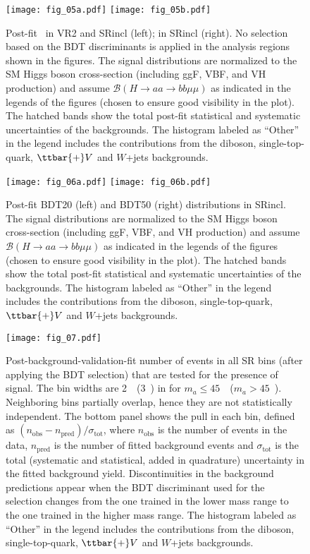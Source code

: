\documentclass[cernpreprint, backref=false, texlive=2020, UKenglish, dvipsnames, block=none, texmf]{atlasdoc}
\begin{document}
\begin{figure}
\centering
\texttt{[image: fig\_05a.pdf]}
\texttt{[image: fig\_05b.pdf]}
\caption{Post-fit \LogL~in VR2 and SRincl (left); \Mmm in SRincl (right). No selection based on the BDT discriminants is applied in the analysis regions shown in the figures. The signal distributions are normalized to the SM Higgs boson cross-section (including ggF, VBF, and VH production) and assume
$\mathcal{B}(H \rightarrow aa \rightarrow bb\mu\mu)$ as indicated in the legends of the figures (chosen to ensure good visibility in the plot). The hatched bands show the total post-fit statistical and systematic uncertainties of the backgrounds. The histogram labeled as ``Other'' in the legend includes the contributions from the diboson, single-top-quark, $\ttbar{+}V$ and $W$+jets backgrounds. }
\label{SRvalidation2}
\end{figure}
 
 
\begin{figure}
\centering
\texttt{[image: fig\_06a.pdf]}
\texttt{[image: fig\_06b.pdf]}
\caption{Post-fit BDT20 (left) and BDT50 (right) distributions in SRincl. The signal distributions are normalized to the SM Higgs boson cross-section (including ggF, VBF, and VH production) and assume
$\mathcal{B}(H \rightarrow aa \rightarrow bb\mu\mu)$ as indicated in the legends of the figures (chosen to ensure good visibility in the plot). The hatched bands show the total post-fit statistical and systematic uncertainties of the backgrounds. The histogram labeled as ``Other'' in the legend includes the contributions from the diboson, single-top-quark, $\ttbar{+}V$ and $W$+jets backgrounds. }
\label{SRvalidation3}
\end{figure}
 
 
 
\begin{figure}
\centering
\texttt{[image: fig\_07.pdf]}
\caption{Post-background-validation-fit number of  events in all SR bins (after applying the BDT selection) that are tested for the presence of signal. The bin widths are 2~\GeV\ (3~\GeV) in \Mmm for $m_a\leq45$~\GeV\ ($m_a>45$~\GeV). Neighboring bins partially overlap, hence they are not statistically independent.
The bottom panel shows the pull in each bin, defined as $(n_\mathrm{obs}-n_\mathrm{pred})/\sigma_\mathrm{tot}$, where $n_\mathrm{obs}$ is the number of events in the data, $n_\mathrm{pred}$ is the number of fitted background events and $\sigma_\mathrm{tot}$ is the total (systematic and statistical, added in quadrature) uncertainty in the fitted background yield.
Discontinuities in the background predictions appear when the BDT discriminant used for the selection changes from the one trained in the lower mass range to the one trained in the higher mass range. The histogram labeled as ``Other'' in the legend includes the contributions from the diboson, single-top-quark, $\ttbar{+}V$ and $W$+jets backgrounds.}
\label{SRpulls}
\end{figure}
 
\end{document}
